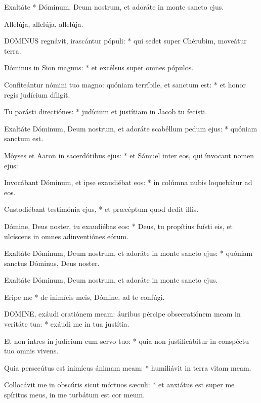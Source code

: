
 Exaltáte * Dóminum, Deum nostrum, et adoráte in monte sancto ejus.


 Allelúja, allelúja, allelúja.


\lettrine[lines=2]{D}{OMINUS} regnávit, irascántur pópuli: * qui sedet super Chérubim, moveátur terra.

Dóminus in Sion magnus: * et excélsus super omnes pópulos.

Confiteántur nómini tuo magno: quóniam terríbile, et sanctum est: * et honor regis judícium díligit.

Tu parásti directiónes: * judícium et justítiam in Jacob tu fecísti.

Exaltáte Dóminum, Deum nostrum, et adoráte scabéllum pedum ejus: * quóniam sanctum est.

Móyses et Aaron in sacerdótibus ejus: * et Sámuel inter eos, qui ínvocant nomen ejus:

Invocábant Dóminum, et ipse exaudiébat eos: * in colúmna nubis loquebátur ad eos.

Custodiébant testimónia ejus, * et præcéptum quod dedit illis.

Dómine, Deus noster, tu exaudiébas eos: * Deus, tu propítius fuísti eis, et ulcíscens in omnes adinventiónes eórum.

Exaltáte Dóminum, Deum nostrum, et adoráte in monte sancto ejus: * quóniam sanctus Dóminus, Deus noster.

 Exaltáte Dóminum, Deum nostrum, et adoráte in monte sancto ejus.

 Eripe me * de inimícis meis, Dómine, ad te confúgi.


\lettrine[lines=2]{D}{OMINE}, exáudi oratiónem meam: áuribus pércipe obsecratiónem meam in veritáte tua: * exáudi me in tua justítia.

Et non intres in judícium cum servo tuo: * quia non justificábitur in conspéctu tuo omnis vivens.

Quia persecútus est inimícus ánimam meam: * humiliávit in terra vitam meam.

Collocávit me in obscúris sicut mórtuos sæculi: * et anxiátus est super me spíritus meus, in me turbátum est cor meum.

